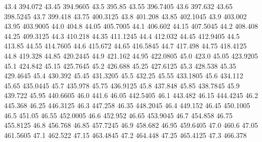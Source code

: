            43.4          394.072
          43.45         394.9605
           43.5           395.85
          43.55         396.7405
           43.6          397.632
          43.65         398.5245
           43.7          399.418
          43.75         400.3125
           43.8          401.208
          43.85         402.1045
           43.9          403.002
          43.95         403.9005
           44.0            404.8
          44.05         405.7005
           44.1          406.602
          44.15         407.5045
           44.2          408.408
          44.25         409.3125
           44.3          410.218
          44.35         411.1245
           44.4          412.032
          44.45         412.9405
           44.5           413.85
          44.55         414.7605
           44.6          415.672
          44.65         416.5845
           44.7          417.498
          44.75         418.4125
           44.8          419.328
          44.85         420.2445
           44.9          421.162
          44.95         422.0805
           45.0            423.0
          45.05         423.9205
           45.1          424.842
          45.15         425.7645
           45.2          426.688
          45.25         427.6125
           45.3          428.538
          45.35         429.4645
           45.4          430.392
          45.45         431.3205
           45.5           432.25
          45.55         433.1805
           45.6          434.112
          45.65         435.0445
           45.7          435.978
          45.75         436.9125
           45.8          437.848
          45.85         438.7845
           45.9          439.722
          45.95         440.6605
           46.0            441.6
          46.05         442.5405
           46.1          443.482
          46.15         444.4245
           46.2          445.368
          46.25         446.3125
           46.3          447.258
          46.35         448.2045
           46.4          449.152
          46.45         450.1005
           46.5           451.05
          46.55         452.0005
           46.6          452.952
          46.65         453.9045
           46.7          454.858
          46.75         455.8125
           46.8          456.768
          46.85         457.7245
           46.9          458.682
          46.95         459.6405
           47.0            460.6
          47.05         461.5605
           47.1          462.522
          47.15         463.4845
           47.2          464.448
          47.25         465.4125
           47.3          466.378
